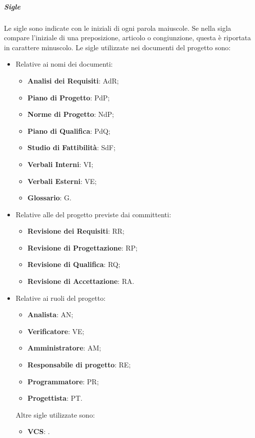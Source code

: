 \subparagraph{Sigle}
Le sigle sono indicate con le iniziali di ogni parola maiuscole. Se nella sigla compare l'iniziale di una preposizione, articolo o congiunzione, questa è riportata in carattere minuscolo.
Le sigle utilizzate nei documenti del progetto sono:
\begin{itemize}
    \item Relative ai nomi dei documenti:
          \begin{itemize}
              \item \textbf{Analisi dei Requisiti}: AdR;
              \item \textbf{Piano di Progetto}: PdP;
              \item \textbf{Norme di Progetto}: NdP;
              \item \textbf{Piano di Qualifica}: PdQ;
              \item \textbf{Studio di Fattibilità}: SdF;
              \item \textbf{Verbali Interni}: VI;
              \item \textbf{Verbali Esterni}: VE;
              \item \textbf{Glossario}: G.
          \end{itemize}
    \item Relative alle  del progetto previste dai committenti:
          \begin{itemize}
              \item \textbf{Revisione dei Requisiti}: RR;
              \item \textbf{Revisione di Progettazione}: RP;
              \item \textbf{Revisione di Qualifica}: RQ;
              \item \textbf{Revisione di Accettazione}: RA.
          \end{itemize}
    \item Relative ai ruoli del progetto:
          \begin{itemize}
              \item \textbf{Analista}: AN;
              \item \textbf{Verificatore}: VE;
              \item \textbf{Amministratore}: AM;
              \item \textbf{Responsabile di progetto}: RE;
              \item \textbf{Programmatore}: PR;
              \item \textbf{Progettista}: PT.
          \end{itemize}
          Altre sigle utilizzate sono:
          \begin{itemize}
              \item \textbf{VCS}: .
          \end{itemize}
\end{itemize}

